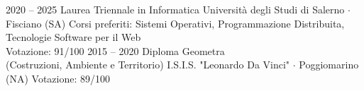 \documentclass[9pt]{developercv} %
\begin{document}
%



\begin{entrylist}
	\entry
		{2020 -- 2025}
		{Laurea Triennale in Informatica}
		{Università degli Studi di Salerno $\cdot$ Fisciano (SA)}
		{Corsi preferiti: Sistemi Operativi, Programmazione Distribuita, Tecnologie Software per il Web \\ Votazione: 91/100}
	\entry
		{2015 -- 2020}
		{Diploma Geometra \\ (Costruzioni, Ambiente e Territorio)}
		{I.S.I.S. "Leonardo Da Vinci" $\cdot$ Poggiomarino (NA)}
		{Votazione: 89/100}
\end{entrylist}


\end{document}
